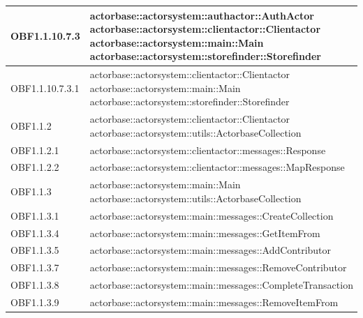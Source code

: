\documentclass{scalatekids-article}
\begin{document}
\begin{longtable}[H]{|p{5cm}|p{12cm}|}
\hline
OBF1.1.10.7.3 & \multiLineCell[t]{actorbase::actorsystem::authactor::AuthActor\\actorbase::actorsystem::clientactor::Clientactor\\actorbase::actorsystem::main::Main\\actorbase::actorsystem::storefinder::Storefinder\\}\\
\hline
OBF1.1.10.7.3.1 & \multiLineCell[t]{actorbase::actorsystem::clientactor::Clientactor\\actorbase::actorsystem::main::Main\\actorbase::actorsystem::storefinder::Storefinder\\}\\
\hline
OBF1.1.2 & \multiLineCell[t]{actorbase::actorsystem::clientactor::Clientactor\\actorbase::actorsystem::utils::ActorbaseCollection\\}\\
\hline
OBF1.1.2.1 & \multiLineCell[t]{actorbase::actorsystem::clientactor::messages::Response\\}\\
\hline
OBF1.1.2.2 & \multiLineCell[t]{actorbase::actorsystem::clientactor::messages::MapResponse\\}\\
\hline
OBF1.1.3 & \multiLineCell[t]{actorbase::actorsystem::main::Main\\actorbase::actorsystem::utils::ActorbaseCollection\\}\\
\hline
OBF1.1.3.1 & \multiLineCell[t]{actorbase::actorsystem::main::messages::CreateCollection\\}\\
\hline
OBF1.1.3.4 & \multiLineCell[t]{actorbase::actorsystem::main::messages::GetItemFrom\\}\\
\hline
OBF1.1.3.5 & \multiLineCell[t]{actorbase::actorsystem::main::messages::AddContributor\\}\\
\hline
OBF1.1.3.7 & \multiLineCell[t]{actorbase::actorsystem::main::messages::RemoveContributor\\}\\
\hline
OBF1.1.3.8 & \multiLineCell[t]{actorbase::actorsystem::main::messages::CompleteTransaction\\}\\
\hline
OBF1.1.3.9 & \multiLineCell[t]{actorbase::actorsystem::main::messages::RemoveItemFrom\\}\\

\end{longtable}
\end{document}
